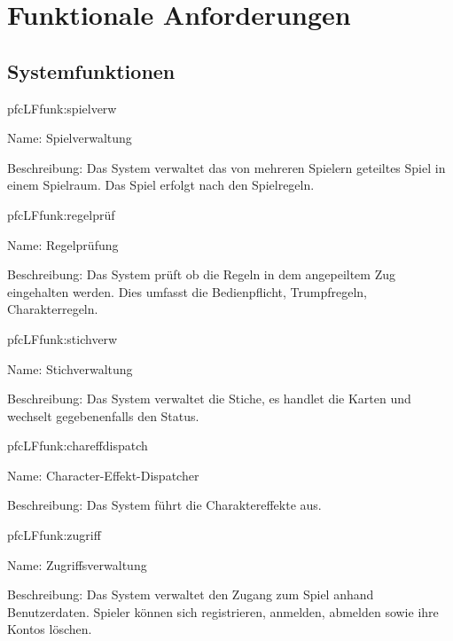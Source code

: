 \chapter{Funktionale Anforderungen}


\section{Systemfunktionen}

\setcounter{pfc}{10}

\begin{description}[leftmargin=5em, style=sameline]
	
	\begin{lhp}{pfc}{LF}{funk:spielverw}
		\item [Name:] Spielverwaltung
		\item [Beschreibung:] Das System verwaltet das von mehreren Spielern geteiltes Spiel in einem Spielraum. Das Spiel erfolgt nach den Spielregeln.
	\end{lhp}
    
	\begin{lhp}{pfc}{LF}{funk:regelprüf}
		\item [Name:] Regelprüfung
		\item [Beschreibung:] Das System prüft ob die Regeln in dem angepeiltem Zug eingehalten werden. Dies umfasst die Bedienpflicht, Trumpfregeln, Charakterregeln.
	\end{lhp}

	\begin{lhp}{pfc}{LF}{funk:stichverw}
		\item [Name:] Stichverwaltung
		\item [Beschreibung:] Das System verwaltet die Stiche, es handlet die Karten und wechselt gegebenenfalls den Status.
	\end{lhp}

	\begin{lhp}{pfc}{LF}{funk:chareffdispatch}
		\item [Name:] Character-Effekt-Dispatcher
		\item [Beschreibung:] Das System führt die Charaktereffekte aus.
	\end{lhp}
    
	\begin{lhp}{pfc}{LF}{funk:zugriff}
		\item [Name:] Zugriffsverwaltung
		\item [Beschreibung:] Das System verwaltet den Zugang zum Spiel anhand Benutzerdaten. Spieler können sich registrieren, anmelden, abmelden sowie ihre Kontos löschen.
	\end{lhp}


\end{description}
